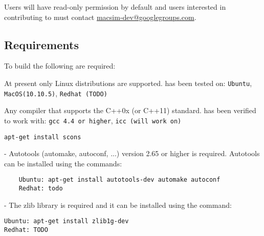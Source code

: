 Users will have read-only permission by default and users interested
in contributing to \SIM must contact
\href{mailto:macsim-dev@googlegroups.com}{macsim-dev@googlegroups.com}.



\subsection{Requirements}

To build \SIM the following are required:

\begingroup
\renewcommand\descriptionlabel[1]{\textit{\hspace\labelsep{#1}}}
\begin{description}\firmlist
  \item[Operating System] At present only Linux distributions are supported. \SIM has been tested on:
   \Verb+Ubuntu+, \Verb+MacOS(10.10.5)+, \Verb+Redhat (TODO)+
  \item[Compiler] Any compiler that supports the C++0x (or C++11)
    standard. \SIM has been verified to work with: \Verb+gcc 4.4 or higher+, \Verb+icc (will work on)+
  \item[SConstruct]

    \Verb+apt-get install scons+

\ignore
	 {
	  \item[Autotools] - Autotools (automake, autoconf,
		...) version 2.65 or higher is required. Autotools can be installed using the commands:
	\begin{Verbatim}
	Ubuntu: apt-get install autotools-dev automake autoconf
	Redhat: todo
	\end{Verbatim}
	}
  
  \item[Libraries] - The zlib library is required and it can be installed using the command:
\begin{Verbatim}
Ubuntu: apt-get install zlib1g-dev
Redhat: TODO
\end{Verbatim}
\end{description}
\endgroup





